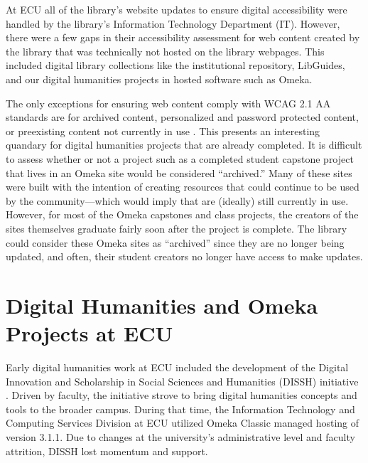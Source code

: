 \documentclass[final]{anthology-ch}
\begin{document}
At ECU all of the library's website updates to ensure digital accessibility were handled by the library's Information Technology Department (IT). However, there were a few gaps in their accessibility assessment for web content created by the library that was technically not hosted on the library webpages. This included digital library collections like the institutional repository, LibGuides, and our digital humanities projects in hosted software such as Omeka.

The only exceptions for ensuring web content comply with WCAG 2.1 AA standards are for archived content, personalized and password protected content, or preexisting content not currently in use \cite{doj2024ada}. This presents an interesting quandary for digital humanities projects that are already completed. It is difficult to assess whether or not a project such as a completed student capstone project that lives in an Omeka site would be considered \enquote{archived.} Many of these sites were built with the intention of creating resources that could continue to be used by the community---which would imply that are (ideally) still currently in use. However, for most of the Omeka capstones and class projects, the creators of the sites themselves graduate fairly soon after the project is complete. The library could consider these Omeka sites as \enquote{archived} since they are no longer being updated, and often, their student creators no longer have access to make updates.

\section{Digital Humanities and Omeka Projects at ECU} \label{sec:omeka}

Early digital humanities work at ECU included the development of the Digital Innovation and Scholarship in Social Sciences and Humanities (DISSH) initiative \cite{ecudissh}. Driven by faculty, the initiative strove to bring digital humanities concepts and tools to the broader campus. During that time, the Information Technology and Computing Services Division at ECU utilized Omeka Classic managed hosting of version 3.1.1. Due to changes at the university's administrative level and faculty attrition, DISSH lost momentum and support.
\end{document}
